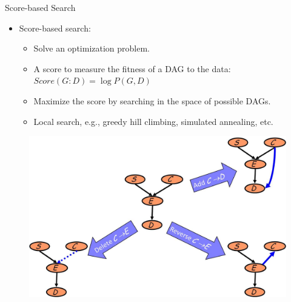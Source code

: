\documentclass[hyperref={pdfpagelabels=false}]{beamer}
\begin{document}
\begin{frame}{Score-based Search}
	\begin{itemize}\small
		\item \alert{Score-based search:}
		\begin{itemize}
			\item Solve an optimization problem.
			\item A score to measure the fitness of a DAG to the data: $Score(G:D)=\log P(G,D)$\\
			\item Maximize the score by searching in the space of possible DAGs.%
			\item Local search, e.g., greedy hill climbing, simulated annealing, etc.			
		\end{itemize}
	\end{itemize}
	\begin{figure}[h]
		\begin{center}
			\includegraphics[scale = .3]{figures/structuresearch.jpg}
		\end{center}
	\end{figure}	
\end{frame}
\end{document}
